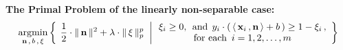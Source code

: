 
\vskip 0.5cm
\noindent
\textbf{The Primal Problem of the linearly non-separable case:}
\begin{eqnarray*}
	\underset{\mathbf{n}\,,\,b\,,\,\xi}{\textnormal{argmin}}
	\left\{\;
		\left.
		\dfrac{1}{2}\cdot\Vert\,\mathbf{n}\,\Vert^{2} + \lambda\cdot\Vert\,\xi\,\Vert_{p}^{p}
		\;\;\right\vert
		\begin{array}{c}
			\xi_{i} \geq 0,\;\,\textnormal{and}\;\, y_{i}\cdot\left(\,\langle\,\mathbf{x}_{i}\,,\mathbf{n}\,\rangle + b\,\right) \geq 1 - \xi_{i}\,,
			\\
			\textnormal{for each \,$i = 1,2,\ldots,m$}
			\end{array}
		\right\}
\end{eqnarray*}



